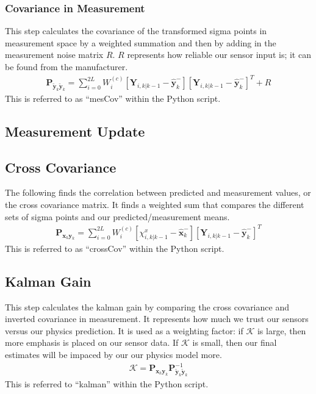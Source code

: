 \documentclass{article}
\newcommand{\x}{\mathbf{x}}
\newcommand{\Cov}{\mathbf{P}}
\newcommand{\Y}{\mathbf{Y}}
\newcommand{\y}{\mathbf{y}}
\begin{document}
\subsubsection{Covariance in Measurement}
This step calculates the covariance of the transformed sigma points in measurement space by a weighted summation and then by adding in the measurement noise matrix $R$. $R$ represents how reliable our sensor input is; it can be found from the manufacturer. 
\begin{align}
    \Cov_{\tilde{\y}_k\tilde{\y}_k} = \sum_{i = 0}^{2L} W_{i}^{(c)} \left[ \Y_{i, k|k-1} - \hat{\y}_k^{-} \right] \left[ \Y_{i, k|k-1} - \hat{\y}_k^{-} \right]^{T} + R \label{eq:mesCov}
\end{align}
This is referred to as ``mesCov'' within the Python script.

\subsection{Measurement Update}
\subsection{Cross Covariance}
The following finds the correlation between predicted and measurement values, or the cross covariance matrix. It finds a weighted sum that compares the different sets of sigma points and our predicted/measurement means. 
\begin{align}
    \Cov_{\x_k\y_k} = \sum_{i = 0}^{2L} W_{i}^{(c)} \left[ \chi^{x}_{i, k|k-1} - \hat{\x}_k^{-} \right] \left[ \Y_{i, k|k-1} - \hat{\y}_k^{-}  \right]^{T} \label{eq:crossCov}
\end{align}
This is referred to as ``crossCov'' within the Python script.

\subsection{Kalman Gain}
 This step calculates the kalman gain by comparing the cross covariance and inverted covariance in measurement. It represents how much we trust our sensors versus our physics prediction. It is used as a weighting factor: if $\mathcal{K}$ is large, then more emphasis is placed on our sensor data. If $\mathcal{K}$ is small, then our final estimates will be impaced by our our physics model more.  
 \begin{align}
    \mathcal{K} = \Cov_{\x_k\y_k} \Cov_{\tilde{\y}_k\tilde{\y}_k}^{-1} \label{eq:kalman}
\end{align}
This is referred to ``kalman'' within the Python script. 
\end{document}

